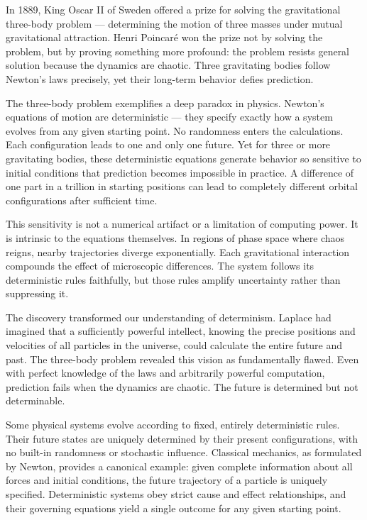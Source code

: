 In 1889, King Oscar II of Sweden offered a prize for solving the gravitational three-body problem — determining the motion of three masses under mutual gravitational attraction. Henri Poincaré won the prize not by solving the problem, but by proving something more profound: the problem resists general solution because the dynamics are chaotic. Three gravitating bodies follow Newton's laws precisely, yet their long-term behavior defies prediction.

The three-body problem exemplifies a deep paradox in physics. Newton's equations of motion are deterministic — they specify exactly how a system evolves from any given starting point. No randomness enters the calculations. Each configuration leads to one and only one future. Yet for three or more gravitating bodies, these deterministic equations generate behavior so sensitive to initial conditions that prediction becomes impossible in practice. A difference of one part in a trillion in starting positions can lead to completely different orbital configurations after sufficient time.

This sensitivity is not a numerical artifact or a limitation of computing power. It is intrinsic to the equations themselves. In regions of phase space where chaos reigns, nearby trajectories diverge exponentially. Each gravitational interaction compounds the effect of microscopic differences. The system follows its deterministic rules faithfully, but those rules amplify uncertainty rather than suppressing it.

The discovery transformed our understanding of determinism. Laplace had imagined that a sufficiently powerful intellect, knowing the precise positions and velocities of all particles in the universe, could calculate the entire future and past. The three-body problem revealed this vision as fundamentally flawed. Even with perfect knowledge of the laws and arbitrarily powerful computation, prediction fails when the dynamics are chaotic. The future is determined but not determinable.

Some physical systems evolve according to fixed, entirely deterministic rules. Their future states are uniquely determined by their present configurations, with no built-in randomness or stochastic influence. Classical mechanics, as formulated by Newton, provides a canonical example: given complete information about all forces and initial conditions, the future trajectory of a particle is uniquely specified. Deterministic systems obey strict cause and effect relationships, and their governing equations yield a single outcome for any given starting point.

